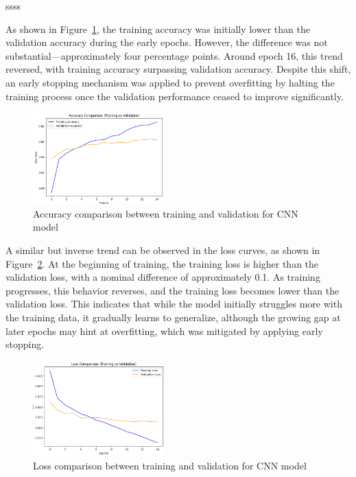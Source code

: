 ssss

As shown in Figure~\ref{fig:cnn_accuracy}, the training accuracy was initially lower than the validation accuracy during the early epochs. However, the difference was not substantial—approximately four percentage points. Around epoch 16, this trend reversed, with training accuracy surpassing validation accuracy. Despite this shift, an early stopping mechanism was applied to prevent overfitting by halting the training process once the validation performance ceased to improve significantly.

\begin{figure}[H]
    \centering
    \includegraphics[width=0.45\textwidth]{images/AccuracyComparisonCNN.png}
    \caption{Accuracy comparison between training and validation for CNN model}
    \label{fig:cnn_accuracy}
\end{figure}

A similar but inverse trend can be observed in the loss curves, as shown in Figure~\ref{fig:cnn_loss}. At the beginning of training, the training loss is higher than the validation loss, with a nominal difference of approximately 0.1. As training progresses, this behavior reverses, and the training loss becomes lower than the validation loss. This indicates that while the model initially struggles more with the training data, it gradually learns to generalize, although the growing gap at later epochs may hint at overfitting, which was mitigated by applying early stopping.

\begin{figure}[H]
    \centering
    \includegraphics[width=0.45\textwidth]{images/LossComparisonCNN.png}
    \caption{Loss comparison between training and validation for CNN model}
    \label{fig:cnn_loss}
\end{figure}

